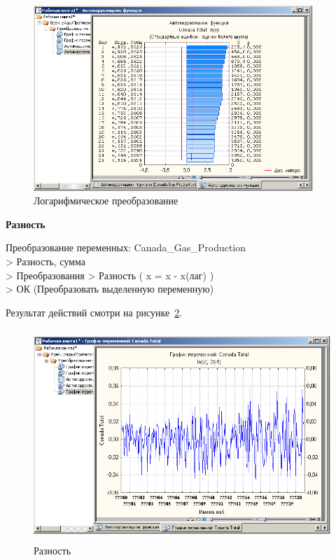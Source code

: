 \begin{figure}[!h]
  \centering

  \includegraphics[height=7cm]
  {inc/Canada_Gas_Production/5.PNG}

  \caption{Логарифмическое преобразование}

  \label{fig:2_5}
\end{figure}


\newpage

\begin{center}
  \textbf{Разность}
\end{center}

Преобразование переменных: Canada\_Gas\_Production\\
> Разность, сумма\\
> Преобразования  > Разность ( x = x - x(лаг) )\\
> ОК (Преобразовать выделенную переменную)

Результат действий смотри на рисунке~\ref{fig:2_6}.

\begin{figure}[!h]
  \centering

  \includegraphics[height=8cm]
  {inc/Canada_Gas_Production/6.PNG}

  \caption{Разность}

  \label{fig:2_6}
\end{figure}


